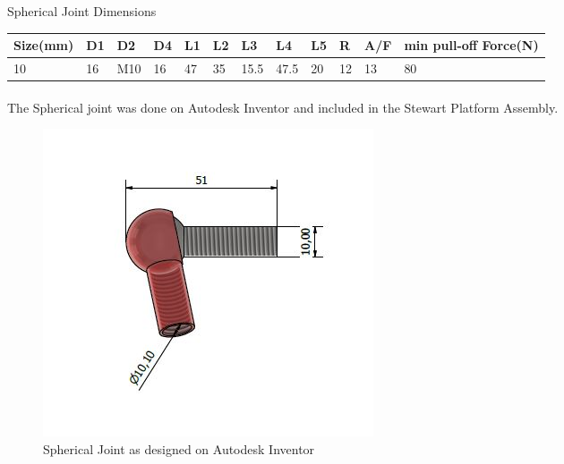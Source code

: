 \begin{table}[H]
\caption{Spherical Joint Dimensions}
\end{table}
\begin{tabular}{|l|l|l|l|l|l|l|l|l|l|l|l|}
\hline
\textbf{Size(mm)}& \textbf{D1}& \textbf{D2}&\textbf{ D4}& \textbf{L1}& \textbf{L2}& \textbf{L3}& \textbf{L4}& \textbf{L5}& \textbf{R} & \textbf{A/F} & \textbf{min pull-off Force(N)}\\
\hline
10 & 16 & M10 & 16 & 47 & 35 & 15.5 & 47.5& 20 & 12 & 13 & 80\\
\hline
\end{tabular}

\paragraph{}

The Spherical joint was done on Autodesk Inventor and included in the Stewart Platform Assembly.
\begin{center}
	\begin{figure}[H]
	\centering
	\includegraphics[width=0.5\linewidth]{Figures/Spherical CAD}
	\caption[Spherical Joint CAD]{Spherical Joint as designed on Autodesk Inventor}
	\end{figure}
\end{center}
